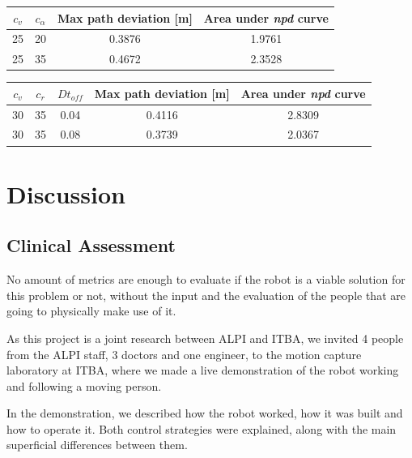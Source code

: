 \documentclass[journal]{IEEEtran}
\begin{document}
\begin{center}
\begin{tabular}{ |c|c|c|c| }
\hline
$c_v$ & $c_{\alpha}$ & Max path deviation [m] & Area under \textit{npd} curve \\
\hline
25  &   20  & 0.3876 & 1.9761\\
25  &   35  & 0.4672 & 2.3528\\
\hline
\end{tabular}
\label{tab:cap_ft_npd_table}
\end{center}


\begin{center}
\begin{tabular}{ |c|c|c|c|c| }
\hline
$c_v$ & $c_r$ & $Dt_{off}$ & Max path deviation [m] & Area under \textit{npd} curve \\
\hline
30  &   35  & 0.04  & 0.4116 & 2.8309\\
30  &   35  & 0.08 & 0.3739 & 2.0367\\
\hline

\end{tabular}
\label{tab:cap_rg_npd_table}
\end{center}

\section{Discussion}
\label{discussion}

\subsection{Clinical Assessment} 
\label{clinical}

No amount of metrics are enough to evaluate if the robot is a viable solution for this problem or not, without the input and the evaluation of the people that are going to physically make use of it. 

As this project is a joint research between ALPI and ITBA, we invited 4 people from the ALPI staff, 3 doctors and one engineer, to the motion capture laboratory at ITBA, where we made a live demonstration of the robot working and following a moving person. 

In the demonstration, we described how the robot worked, how it was built and how to operate it. Both control strategies were explained, along with the main superficial differences between them. 
\end{document}
